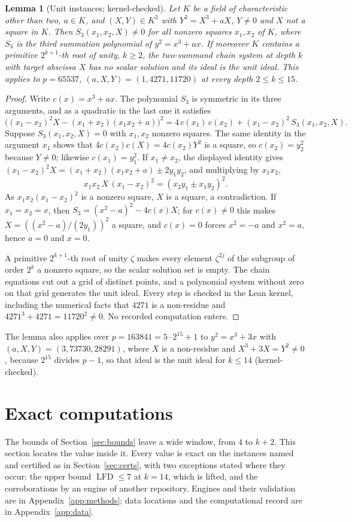 \documentclass[11pt]{article}
\newtheorem{lemma}[theorem]{Lemma}
\theoremstyle{definition}\newtheorem{definition}[theorem]{Definition}
\theoremstyle{remark}\newtheorem{remark}[theorem]{Remark}
\newcommand{\lfd}{\operatorname{LFD}}
\begin{document}
\begin{lemma}[Unit instances; kernel-checked]\label{lem:unit}
Let $K$ be a field of characteristic other than two, $a\in K$, and
$(X,Y)\in K^2$ with $Y^2=X^3+aX$, $Y\ne0$ and $X$ not a square in $K$. Then
$S_3(x_1,x_2,X)\ne0$ for all nonzero squares $x_1,x_2$ of $K$, where $S_3$ is
the third summation polynomial of $y^2=x^3+ax$. If moreover $K$ contains a
primitive $2^{k+1}$-th root of unity, $k\ge2$, the two-summand chain system
at depth $k$ with target abscissa $X$ has no scalar solution and its ideal
is the unit ideal. This applies to $p=65537$, $(a,X,Y)=(1,4271,11720)$ at
every depth $2\le k\le15$.
\end{lemma}
\begin{proof}
Write $c(x)=x^3+ax$. The polynomial $S_3$ is symmetric in its three
arguments, and as a quadratic in the last one it satisfies
\[
\bigl((x_1-x_2)^2X-(x_1+x_2)(x_1x_2+a)\bigr)^2
 =4\,c(x_1)\,c(x_2)+(x_1-x_2)^2\,S_3(x_1,x_2,X).
\]
Suppose $S_3(x_1,x_2,X)=0$ with $x_1,x_2$ nonzero squares. The same identity
in the argument $x_1$ shows that $4c(x_2)c(X)=4c(x_2)Y^2$ is a square, so
$c(x_2)=y_2^2$ because $Y\ne0$; likewise $c(x_1)=y_1^2$. If $x_1\ne x_2$, the
displayed identity gives $(x_1-x_2)^2X=(x_1+x_2)(x_1x_2+a)\pm2y_1y_2$, and
multiplying by $x_1x_2$,
\[
x_1x_2\,X\,(x_1-x_2)^2=(x_2y_1\pm x_1y_2)^2 .
\]
As $x_1x_2(x_1-x_2)^2$ is a nonzero square, $X$ is a square, a
contradiction. If $x_1=x_2=x$, then $S_3=(x^2-a)^2-4c(x)X$; for $c(x)\ne0$
this makes $X=((x^2-a)/(2y_1))^2$ a square, and $c(x)=0$ forces $x^2=-a$
and $x^2=a$, hence $a=0$ and $x=0$.

A primitive $2^{k+1}$-th root of unity $\zeta$ makes every element
$\zeta^{2j}$ of the subgroup of order $2^k$ a nonzero square, so the scalar
solution set is empty. The chain equations cut out a grid of distinct
points, and a polynomial system without zero on that grid generates the unit
ideal. Every step is checked in the Lean kernel, including the numerical
facts that $4271$ is a non-residue and $4271^3+4271=11720^2\ne0$. No
recorded computation enters.
\end{proof}
The lemma also applies over $p=163841=5\cdot2^{15}+1$ to $y^2=x^3+3x$ with
$(a,X,Y)=(3,73730,28291)$, where $X$ is a non-residue and $X^3+3X=Y^2\ne0$,
because $2^{15}$ divides $p-1$, so that ideal is the unit ideal for
$k\le14$ (kernel-checked).

\section{Exact computations}\label{sec:computations}
The bounds of Section~\ref{sec:bounds} leave a wide window, from $4$ to
$k+2$. This section locates the value inside it. Every value is exact on the
instances named and certified as in Section~\ref{sec:certs}, with two
exceptions stated where they occur: the upper bound $\lfd\le7$ at $k=14$,
which is lifted, and the corroborations by an engine of another repository.
Engines and their validation are in Appendix~\ref{app:methods}; data
locations and the computational record are in Appendix~\ref{app:data}.
\end{document}
